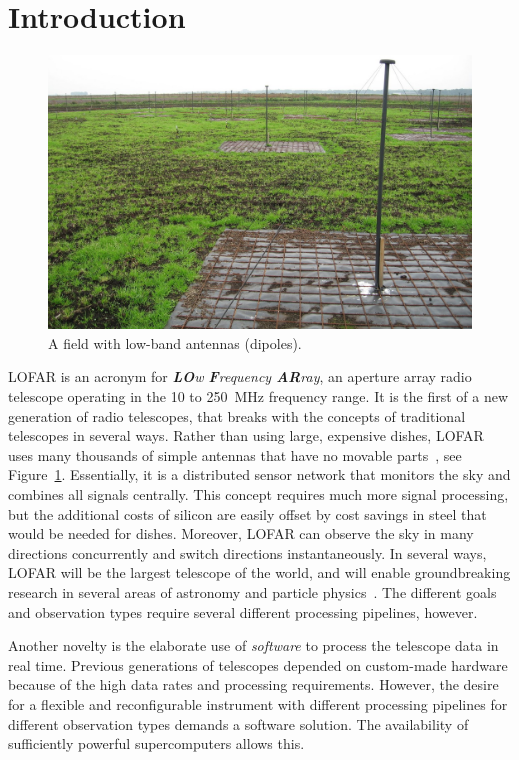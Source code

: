 \documentclass{sig-alternate}
\begin{document}
\section{Introduction}

\begin{figure}[ht]
\begin{center}
\includegraphics[width=0.8\columnwidth]{LBA-field.jpg}
\end{center}
\caption{A field with low-band antennas (dipoles).}
\label{fig:lba-field}
\end{figure}

LOFAR is an acronym for \emph{\textbf{LO}w \textbf{F}requency \textbf{AR}ray},
an aperture array radio telescope operating in the 10 to 250~MHz frequency
range.
It is the first of a new generation of radio telescopes, that breaks with
the concepts of traditional telescopes in several ways.
Rather than using large, expensive dishes, LOFAR uses many thousands of
simple antennas that have no movable parts~\cite{Butcher:04,deVos:09}, see Figure~\ref{fig:lba-field}.
Essentially, it is a distributed sensor network that monitors the sky
and combines all signals centrally.
This concept requires much more signal processing, but the additional costs
of silicon are easily offset by cost savings in steel that would be needed for dishes.
Moreover, LOFAR can observe the sky in many directions concurrently and
switch directions instantaneously. 
In several ways, LOFAR will be the largest telescope of the world, 
and will enable groundbreaking research in several areas of astronomy and particle
physics~\cite{Bruyn:02}. The different goals and observation types require
several different processing pipelines, however.

Another novelty is the elaborate use of \emph{software\/} to process
the telescope data in real time.
Previous generations of telescopes depended on custom-made hardware
because of the high data rates and processing requirements.
However, the desire for a flexible and reconfigurable instrument with
different processing pipelines for different observation types demands a
software solution.
The availability of sufficiently powerful supercomputers allows this.
\end{document}
